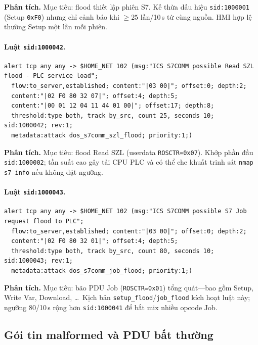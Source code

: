 \documentclass[../main.tex]{subfiles}
\begin{document}
\noindent\textbf{Phân tích.}
Mục tiêu: flood thiết lập phiên S7. Kế thừa dấu hiệu \texttt{sid:1000001} (Setup \texttt{0xF0}) nhưng chỉ cảnh báo khi $\geq 25$ lần/10\,s từ cùng nguồn. HMI hợp lệ thường Setup một lần mỗi phiên.

\paragraph{Luật \texttt{sid:1000042}.}
\begin{footnotesize}
\begin{verbatim}
alert tcp any any -> $HOME_NET 102 (msg:"ICS S7COMM possible Read SZL flood - PLC service load";
  flow:to_server,established; content:"|03 00|"; offset:0; depth:2;
  content:"|02 F0 80 32 07|"; offset:4; depth:5;
  content:"|00 01 12 04 11 44 01 00|"; offset:17; depth:8;
  threshold:type both, track by_src, count 25, seconds 10; sid:1000042; rev:1;
  metadata:attack dos_s7comm_szl_flood; priority:1;)
\end{verbatim}
\end{footnotesize}

\noindent\textbf{Phân tích.}
Mục tiêu: flood Read SZL (userdata \texttt{ROSCTR=0x07}). Khớp phần đầu \texttt{sid:1000002}; tần suất cao gây tải CPU PLC và có thể che khuất trinh sát \texttt{nmap s7-info} nếu không đặt ngưỡng.

\paragraph{Luật \texttt{sid:1000043}.}
\begin{footnotesize}
\begin{verbatim}
alert tcp any any -> $HOME_NET 102 (msg:"ICS S7COMM possible S7 Job request flood to PLC";
  flow:to_server,established; content:"|03 00|"; offset:0; depth:2;
  content:"|02 F0 80 32 01|"; offset:4; depth:5;
  threshold:type both, track by_src, count 80, seconds 10; sid:1000043; rev:1;
  metadata:attack dos_s7comm_job_flood; priority:1;)
\end{verbatim}
\end{footnotesize}

\noindent\textbf{Phân tích.}
Mục tiêu: bão PDU Job (\texttt{ROSCTR=0x01}) tổng quát---bao gồm Setup, Write Var, Download, \ldots\ Kịch bản \texttt{setup\_flood}/\texttt{job\_flood} kích hoạt luật này; ngưỡng 80/10\,s rộng hơn \texttt{sid:1000041} để bắt mix nhiều opcode Job.

\subsection{Gói tin malformed và PDU bất thường}
\label{sec:rules-malformed}
\end{document}
